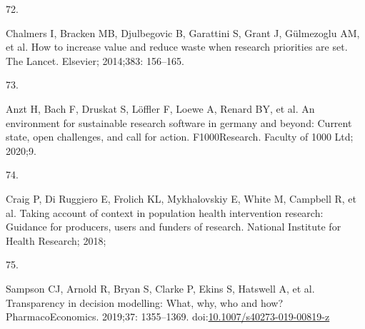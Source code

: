 \documentclass[
]{article}
\newlength{\cslhangindent}
\newlength{\csllabelwidth}
\newlength{\cslentryspacingunit} %
\newenvironment{CSLReferences}[2] %
 {%
  \setlength{\parindent}{0pt}
  \ifodd #1
  \let\oldpar\par
  \def\par{\hangindent=\cslhangindent\oldpar}
  \fi
  \setlength{\parskip}{#2\cslentryspacingunit}
 }%
 {}
\newcommand{\CSLLeftMargin}[1]{\parbox[t]{\csllabelwidth}{#1}}
\newcommand{\CSLRightInline}[1]{\parbox[t]{\linewidth - \csllabelwidth}{#1}\break}
\begin{document}
\begin{CSLReferences}{0}{0}
\leavevmode{}%
\CSLLeftMargin{72. }%
\CSLRightInline{Chalmers I, Bracken MB, Djulbegovic B, Garattini S, Grant J, Gülmezoglu AM, et al. How to increase value and reduce waste when research priorities are set. The Lancet. Elsevier; 2014;383: 156--165. }

\leavevmode{}%
\CSLLeftMargin{73. }%
\CSLRightInline{Anzt H, Bach F, Druskat S, Löffler F, Loewe A, Renard BY, et al. An environment for sustainable research software in germany and beyond: Current state, open challenges, and call for action. F1000Research. Faculty of 1000 Ltd; 2020;9. }

\leavevmode{}%
\CSLLeftMargin{74. }%
\CSLRightInline{Craig P, Di Ruggiero E, Frolich KL, Mykhalovskiy E, White M, Campbell R, et al. Taking account of context in population health intervention research: Guidance for producers, users and funders of research. National Institute for Health Research; 2018; }

\leavevmode{}%
\CSLLeftMargin{75. }%
\CSLRightInline{Sampson CJ, Arnold R, Bryan S, Clarke P, Ekins S, Hatswell A, et al. Transparency in decision modelling: What, why, who and how? PharmacoEconomics. 2019;37: 1355--1369. doi:\href{https://doi.org/10.1007/s40273-019-00819-z}{10.1007/s40273-019-00819-z}}

\end{CSLReferences}

\newpage
\appendix
{}
\end{document}
